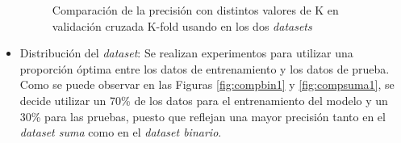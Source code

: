 \begin{itemize}
    \begin{figure}[htb!]
    \begin{center}
    \caption{Comparación de la precisión con distintos valores de K en validación cruzada K-fold usando en los dos \textit{datasets}}
    \label{fig:comp_kfold}
    \end{center}
    \end{figure}
    
    \item Distribución del \textit{dataset}: Se realizan experimentos para utilizar una proporción óptima entre los datos de entrenamiento y los datos de prueba. Como se puede observar en las Figuras \ref{fig:compbin1} y \ref{fig:compsuma1}, se decide utilizar un 70\% de los datos para el entrenamiento del modelo y un 30\% para las pruebas, puesto que reflejan una mayor precisión tanto en el \textit{dataset suma} como en el \textit{dataset binario}.
    

\end{itemize}
